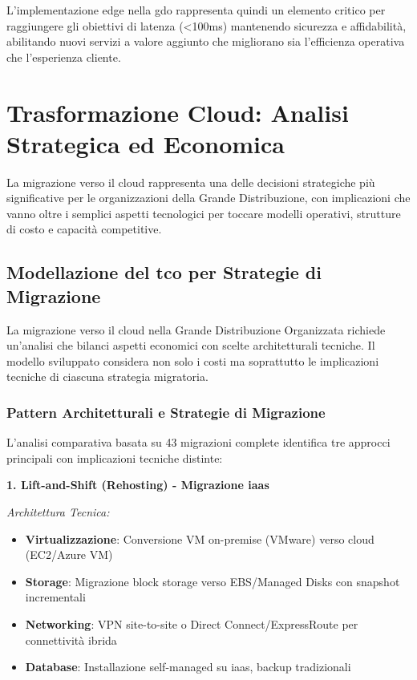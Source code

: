 L'implementazione \gls{edge} nella \gls{gdo} rappresenta quindi un elemento critico per raggiungere gli obiettivi di latenza (<100ms) mantenendo sicurezza e affidabilità, abilitando nuovi servizi a valore aggiunto che migliorano sia l'efficienza operativa che l'esperienza cliente.
\section{\texorpdfstring{Trasformazione Cloud: Analisi Strategica ed Economica}{3.4 - Trasformazione Cloud: Analisi Strategica ed Economica}}

La migrazione verso il cloud rappresenta una delle decisioni strategiche più significative per le organizzazioni della Grande Distribuzione, con implicazioni che vanno oltre i semplici aspetti tecnologici per toccare modelli operativi, strutture di costo e capacità competitive.

\subsection{\texorpdfstring{Modellazione del \gls{tco} per Strategie di Migrazione}{3.4.1 - Modellazione del TCO per Strategie di Migrazione}}

La migrazione verso il cloud nella Grande Distribuzione Organizzata richiede un'analisi che bilanci aspetti economici con scelte architetturali tecniche. Il modello sviluppato\autocite{KhajehHosseini2024} considera non solo i costi ma soprattutto le implicazioni tecniche di ciascuna strategia migratoria.

\subsubsection{\texorpdfstring{Pattern Architetturali e Strategie di Migrazione}{3.4.1.1 - Pattern Architetturali e Strategie di Migrazione}}

L'analisi comparativa basata su 43 migrazioni complete\autocite{McKinsey2024cloud} identifica tre approcci principali con implicazioni tecniche distinte:

\textbf{1. Lift-and-Shift (Rehosting) - Migrazione \gls{iaas}}

\textit{Architettura Tecnica:}
\begin{itemize}
    \item \textbf{Virtualizzazione}: Conversione VM on-premise (VMware) verso cloud (EC2/Azure VM)
    \item \textbf{Storage}: Migrazione block storage verso EBS/Managed Disks con snapshot incrementali
    \item \textbf{Networking}: VPN site-to-site o Direct Connect/ExpressRoute per connettività ibrida
    \item \textbf{Database}: Installazione self-managed su \gls{iaas}, backup tradizionali
\end{itemize}

